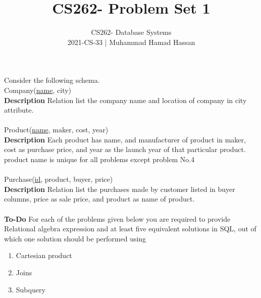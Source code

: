 \documentclass[10pt,a4paper]{article}
\begin{document}
 
\title{CS262- Problem Set 1}
\author{
CS262- Database Systems\\
2021-CS-33 | Muhammad Hamad Hassan\\}
\maketitle
\noindent
Consider the following schema.\\
Company(\underline{name}, city)\\
\textbf{Description}
Relation list the company name and location of company in city attribute. \\ \\
\noindent
Product(\underline{name}, maker, cost, year)\\ 
\textbf{Description}
Each product has name, and manufacturer of product in maker, cost as purchase price, and year as the launch year of that particular product. product name is unique for all problems except problem No.4 \\ \\
Purchase(\underline{id}, product, buyer, price)\\
\textbf{Description}
Relation list the purchases made by customer listed in buyer columns, price as sale price, and product as name of product. 
\\ \\
\noindent
\textbf{To-Do} For each of the problems given below you are required to provide Relational algebra expression and at least five equivalent solutions in SQL, out of which one solution should be performed using
\begin{enumerate}
    \item Cartesian product
    \item Joins
    \item Subquery
\end{enumerate}
\end{document}
